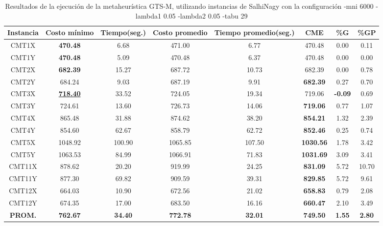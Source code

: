 \begin{table}[h]
\caption{Resultados de la ejecución de la metaheurística GTS-M, utilizando instancias de SalhiNagy con la configuración -mni 6000 -lambda1 0.05 -lambda2 0.05 -tabu 29}
\centering
\small
\begin{tabular}{c c c c c c c c}
\hline\hline
Instancia & Costo mínimo & Tiempo(seg.) & Costo promedio & Tiempo promedio(seg.) & CME & \%G & \%GP \\ [0.5ex]
\hline
CMT1X & \bf{470.48} & 6.68 & 
471.00 & 6.77 & 470.48 & 0.00
 & 0.11\\CMT1Y & \bf{470.48} & 5.09 & 
470.48 & 6.37 & 470.48 & 0.00
 & 0.00\\
CMT2X & \bf{682.39} & 15.27 & 
687.72 & 10.73 & 682.39 & 0.00
 & 0.78\\CMT2Y & 684.24 & 9.03 & 
687.19 & 9.91 & \bf{682.39} & 
0.27 & 0.70\\CMT3X & \bf{\underline{718.40}} & 33.52 & 
724.05 & 19.34 & 719.06 & 
\bf{-0.09} & 0.69\\CMT3Y & 724.61 & 13.60 & 
726.73 & 14.06 & \bf{719.06} & 
0.77 & 1.07\\CMT4X & 865.48 & 31.88 & 
874.62 & 38.20 & \bf{854.21} & 
1.32 & 2.39\\CMT4Y & 854.60 & 62.67 & 
858.79 & 62.72 & \bf{852.46} & 
0.25 & 0.74\\CMT5X & 1048.92 & 100.90 & 
1065.85 & 107.50 & \bf{1030.56} & 
1.78 & 3.42\\CMT5Y & 1063.53 & 84.99 & 
1066.91 & 71.83 & \bf{1031.69} & 
3.09 & 3.41\\CMT11X & 878.62 & 20.20 & 
919.99 & 24.25 & \bf{831.09} & 
5.72 & 10.70\\CMT11Y & 877.30 & 69.82 & 
909.59 & 39.31 & \bf{829.85} & 
5.72 & 9.61\\CMT12X & 664.03 & 10.90 & 
672.56 & 21.02 & \bf{658.83} & 
0.79 & 2.08\\CMT12Y & 674.35 & 17.00 & 
683.50 & 16.16 & \bf{660.47} & 
2.10 & 3.49\\\bf{PROM.} & 
\bf{762.67} & \bf{34.40} & \bf{772.78} & \bf{32.01} & \bf{749.50} & \bf{1.55} & \bf{2.80}\\[1ex]\hline
\end{tabular}
\label{table:nonlin}
\end{table} 
